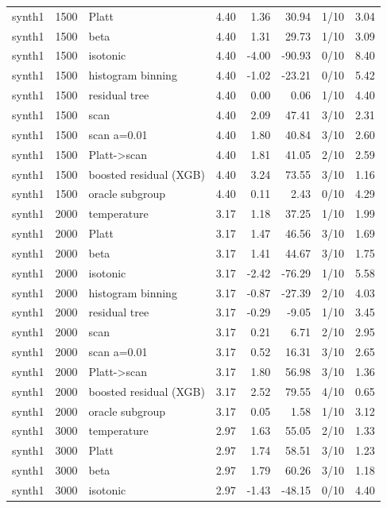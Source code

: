 \begin{tabular}{lllrrrlr}
synth1 & 1500 & Platt & 4.40 & 1.36 & 30.94 & 1/10 & 3.04 \\
synth1 & 1500 & beta & 4.40 & 1.31 & 29.73 & 1/10 & 3.09 \\
synth1 & 1500 & isotonic & 4.40 & -4.00 & -90.93 & 0/10 & 8.40 \\
synth1 & 1500 & histogram binning & 4.40 & -1.02 & -23.21 & 0/10 & 5.42 \\
synth1 & 1500 & residual tree & 4.40 & 0.00 & 0.06 & 1/10 & 4.40 \\
synth1 & 1500 & scan & 4.40 & 2.09 & 47.41 & 3/10 & 2.31 \\
synth1 & 1500 & scan a=0.01 & 4.40 & 1.80 & 40.84 & 3/10 & 2.60 \\
synth1 & 1500 & Platt->scan & 4.40 & 1.81 & 41.05 & 2/10 & 2.59 \\
synth1 & 1500 & boosted residual (XGB) & 4.40 & 3.24 & 73.55 & 3/10 & 1.16 \\
synth1 & 1500 & oracle subgroup & 4.40 & 0.11 & 2.43 & 0/10 & 4.29 \\
synth1 & 2000 & temperature & 3.17 & 1.18 & 37.25 & 1/10 & 1.99 \\
synth1 & 2000 & Platt & 3.17 & 1.47 & 46.56 & 3/10 & 1.69 \\
synth1 & 2000 & beta & 3.17 & 1.41 & 44.67 & 3/10 & 1.75 \\
synth1 & 2000 & isotonic & 3.17 & -2.42 & -76.29 & 1/10 & 5.58 \\
synth1 & 2000 & histogram binning & 3.17 & -0.87 & -27.39 & 2/10 & 4.03 \\
synth1 & 2000 & residual tree & 3.17 & -0.29 & -9.05 & 1/10 & 3.45 \\
synth1 & 2000 & scan & 3.17 & 0.21 & 6.71 & 2/10 & 2.95 \\
synth1 & 2000 & scan a=0.01 & 3.17 & 0.52 & 16.31 & 3/10 & 2.65 \\
synth1 & 2000 & Platt->scan & 3.17 & 1.80 & 56.98 & 3/10 & 1.36 \\
synth1 & 2000 & boosted residual (XGB) & 3.17 & 2.52 & 79.55 & 4/10 & 0.65 \\
synth1 & 2000 & oracle subgroup & 3.17 & 0.05 & 1.58 & 1/10 & 3.12 \\
synth1 & 3000 & temperature & 2.97 & 1.63 & 55.05 & 2/10 & 1.33 \\
synth1 & 3000 & Platt & 2.97 & 1.74 & 58.51 & 3/10 & 1.23 \\
synth1 & 3000 & beta & 2.97 & 1.79 & 60.26 & 3/10 & 1.18 \\
synth1 & 3000 & isotonic & 2.97 & -1.43 & -48.15 & 0/10 & 4.40 \\

\end{tabular}
